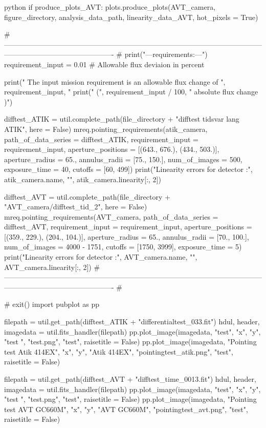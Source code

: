 \documentclass[../main.tex]{subfiles}
\begin{document}
\begin{mintedbox}{python}
if produce_plots_AVT:
plots.produce_plots(AVT_camera, figure_directory, analysis_data_path, linearity_data_AVT, hot_pixels  =  True)

# ---------------------------------------------------------------------------------------------------------------------------------------------------------- #
print("\n\n---\nMission requirements:\n---")
requirement_input  =  0.01  # Allowable flux deviaion in percent

print(" The input mission requirement is an allowable flux change of ", requirement_input, "%
print("  (", requirement_input / 100, " absolute flux change )")

difftest_ATIK  =  util.complete_path(file_directory + "difftest tidsvar lang ATIK", here  =  False)
mreq.pointing_requirements(atik_camera, path_of_data_series  =  difftest_ATIK,
requirement_input  =  requirement_input,
aperture_positions  =  [(643., 676.), (434., 503.)], aperture_radius  =  65.,
annulus_radii  =  [75., 150.], num_of_images  =  500, exposure_time  =  40,
cutoffs  =  [60, 499])
print("Linearity errors for detector :", atik_camera.name, "\n ", atik_camera.linearity[:, 2])

difftest_AVT  =  util.complete_path(file_directory + "AVT_camera/difftest_tid_2", here  =  False)
mreq.pointing_requirements(AVT_camera, path_of_data_series  =  difftest_AVT,
requirement_input  =  requirement_input,
aperture_positions  =  [(359., 229.), (204., 104.)], aperture_radius  =  65.,
annulus_radii  =  [70., 100.], num_of_images  =  4000 - 1751, cutoffs  =  [1750, 3999],
exposure_time  =  5)
print("Linearity errors for detector :", AVT_camera.name, "\n ", AVT_camera.linearity[:, 2])
# ---------------------------------------------------------------------------------------------------------------------------------------------------------- #

# exit()
import pubplot as pp

filepath  =  util.get_path(difftest_ATIK + "differentialtest_033.fit")
hdul, header, imagedata  =  util.fits_handler(filepath)
pp.plot_image(imagedata, "test", "x", "y", "test ", "test.png", "test", raisetitle  =  False)
pp.plot_image(imagedata, "Pointing test Atik 414EX", "x", "y", "Atik 414EX", "pointingtest_atik.png", "test",
raisetitle  =  False)

filepath  =  util.get_path(difftest_AVT + "difftest_time_0013.fit")
hdul, header, imagedata  =  util.fits_handler(filepath)
pp.plot_image(imagedata, "test", "x", "y", "test ", "test.png", "test", raisetitle  =  False)
pp.plot_image(imagedata, "Pointing test AVT GC660M", "x", "y", "AVT GC660M", "pointingtest_avt.png", "test",
raisetitle  =  False)

\end{mintedbox}
\end{document}
